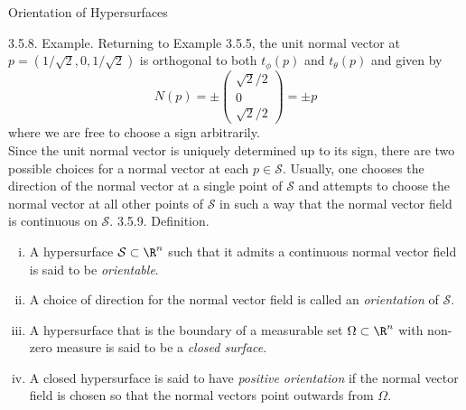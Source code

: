 \documentclass[smaller,hyperref={CJKbookmarks=true}]{beamer}
\begin{document}
\begin{frame}{Orientation of Hypersurfaces}
\begin{spacing}{1.05}
\vspace*{12pt}
\alert{3.5.8. Example.} Returning to Example 3.5.5, the unit normal vector at $p=(1/\sqrt{2},0,1/\sqrt{2})$ is orthogonal to both $t_\phi(p)$ and $t_\theta(p)$ and given by
\[N(p)=\pm\begin{pmatrix}
            \sqrt{2}/2 \\
            0 \\
            \sqrt{2}/2
          \end{pmatrix}=\pm p\]
where we are free to choose a sign arbitrarily.\\[6pt]
Since the unit normal vector is uniquely determined up to its sign, there
are two possible choices for a normal vector at each $p\in\mathcal{S}$. Usually, one
chooses the direction of the normal vector at a single point of $\mathcal{S}$ and
attempts to choose the normal vector at all other points of $\mathcal{S}$ in such a
way that the normal vector field is continuous on $\mathcal{S}$.
\newpage
\alert{3.5.9. Definition.}
\begin{enumerate}[(i)]
  \item A hypersurface $\mathcal{S}\subset\R^n$ such that it admits a continuous normal
vector field is said to be \emph{orientable}.
  \item A choice of direction for the normal vector field is called an
\emph{orientation} of $\mathcal{S}$.
  \item A hypersurface that is the boundary of a measurable set $\Omega\subset\R^n$ with non-zero measure is said to be a \emph{closed surface}.
  \item A closed hypersurface is said to have \emph{positive orientation} if the
normal vector field is chosen so that the normal vectors point
outwards from $\Omega$.
\end{enumerate}
\end{spacing}
\end{frame}
\end{document}
